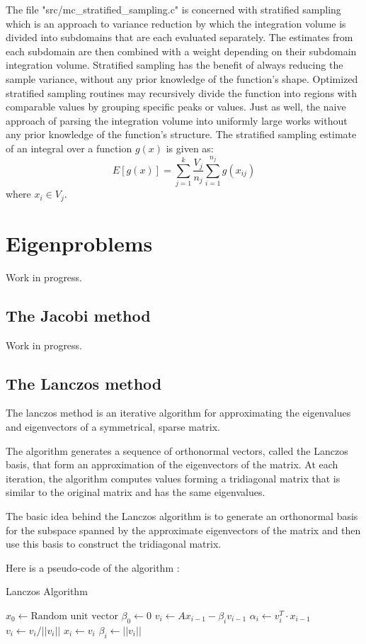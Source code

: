 \documentclass{book}
\begin{document}
The file "src/mc\_stratified\_sampling.c" is concerned with stratified sampling which is an approach to variance reduction
by which the integration volume is divided into subdomains that are each evaluated separately. The estimates from each
subdomain are then combined with a weight depending on their subdomain integration volume. Stratified sampling has the
benefit of always reducing the sample variance, without any prior knowledge of the function’s shape. Optimized stratified
sampling routines may recursively divide the function into regions with comparable values by grouping specific peaks or values.
Just as well, the naive approach of parsing the integration volume into uniformly large works without any prior knowledge of the function’s structure.
The stratified sampling estimate of an integral over a function $g(x)$ is given as:
$$
 E[g(x)] = \sum_{j=1}^k \frac{V_j}{n_j} \sum_{i=1}^{n_j} g(x_{ij})
$$
where $x_i \in V_j$.



\section{Eigenproblems}

Work in progress.
\subsection{The Jacobi method}

Work in progress.
\subsection{The Lanczos method}

The lanczos method is an iterative algorithm for approximating the eigenvalues and eigenvectors of a symmetrical, sparse matrix.

The algorithm generates a sequence of orthonormal vectors, called the Lanczos basis, that form an approximation of the eigenvectors of the matrix. At each iteration, the algorithm computes values forming a tridiagonal matrix that is similar to the original matrix and has the same eigenvalues.

The basic idea behind the Lanczos algorithm is to generate an orthonormal basis for the subspace spanned by the approximate eigenvectors of the matrix and then use this basis to construct the tridiagonal matrix.

Here is a pseudo-code of the algorithm :

\begin{algorithm}
  \caption{Lanczos Algorithm}
  \begin{algorithmic}[1]
    \State $\text{$x_{0}$} \gets \text{Random unit vector}$
    \State $\beta_{0} \gets 0$
   
    \State $\textit{v}_{i} \gets Ax_{i-1} - \beta_{i}\textit{v}_{i-1}$
    \State $\alpha_{i} \gets v_{i}^{T} \cdot x_{i-1}$
    \State $v_{i} \gets v_{i}/||v_{i}||$
    \State $x_{i} \gets v_{i}$
    \State $\beta_{i} \gets ||v_{i}||$
  \EndFor
  \end{algorithmic}
\end{algorithm}
\end{document}
